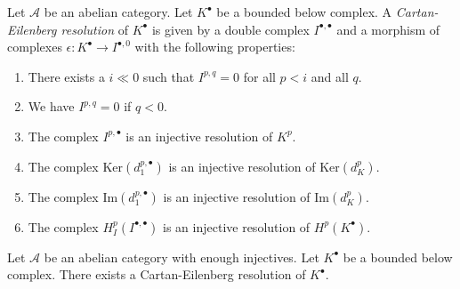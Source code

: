 \begin{definition}
\label{definition-cartan-eilenberg}
Let $\mathcal{A}$ be an abelian category.
Let $K^\bullet$ be a bounded below complex.
A {\it Cartan-Eilenberg resolution} of $K^\bullet$
is given by a double complex $I^{\bullet, \bullet}$
and a morphism of complexes $\epsilon : K^\bullet \to I^{\bullet, 0}$
with the following properties:
\begin{enumerate}
\item There exists a $i \ll 0$ such that $I^{p, q} = 0$ for all $p < i$
and all $q$.
\item We have $I^{p, q} = 0$ if $q < 0$.
\item The complex $I^{p, \bullet}$ is an injective resolution of $K^p$.
\item The complex $\text{Ker}(d_1^{p, \bullet})$ is an injective resolution
of $\text{Ker}(d_K^p)$.
\item The complex $\text{Im}(d_1^{p, \bullet})$ is an injective resolution
of $\text{Im}(d_K^p)$.
\item The complex $H^p_I(I^{\bullet, \bullet})$ is an injective resolution
of $H^p(K^\bullet)$.
\end{enumerate}
\end{definition}

\begin{lemma}
\label{lemma-cartan-eilenberg}
Let $\mathcal{A}$ be an abelian category with enough injectives.
Let $K^\bullet$ be a bounded below complex.
There exists a Cartan-Eilenberg resolution of $K^\bullet$.
\end{lemma}


